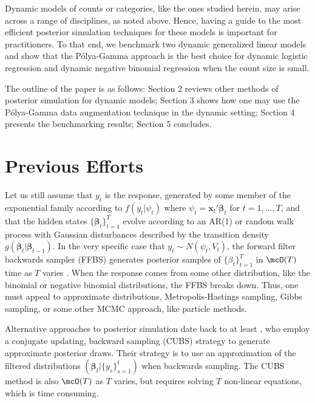 \documentclass[12pt]{article}
\newcommand{\Polya}{P\'{o}lya}
\newcommand{\bbeta}{\boldsymbol{\beta}}
\newcommand{\vx}{\boldsymbol{x}}
\newcounter{parnum}
\newcommand{\npoint}{%
  \noindent\refstepcounter{parnum}%
  \makebox[0.5in][c]{\textbf{\arabic{parnum}.}} %
  \marginnote{\small\ttfamily\the\inputlineno}}
\renewcommand{\npoint}{}
\begin{document}
\npoint Dynamic models of counts or categories, like the ones studied herein,
may arise across a range of disciplines, as noted above.  Hence, having a guide
to the most efficient posterior simulation techniques for these models is
important for practitioners.  To that end, we benchmark two dynamic generalized
linear models and show that the \Polya-Gamma approach is the best choice for
dynamic logistic regression and dynamic negative binomial regression when the
count size is small.

\npoint The outline of the paper is as follows: Section 2 reviews other methods
of posterior simulation for dynamic models; Section 3 shows how one may use the
\Polya-Gamma data augmentation technique in the dynamic setting; Section 4
presents the benchmarking results; Section 5 concludes.

\section{Previous Efforts}
\label{sec:previous-efforts}

\npoint Let us still assume that $y_t$ is the response, generated by some member
of the exponential family according to $f(y_t | \psi_t)$ where $\psi_t = \vx_t'
\bbeta_t$ for $t=1, \ldots, T$, and that the hidden states
$\{\bbeta_t\}_{t=1}^T$ evolve according to an AR(1) or random walk process with
Gaussian disturbances described by the transition density $g(\bbeta_t |
\bbeta_{t-1})$.
\npoint In the very specific case that $y_t \sim N(\psi_t, V_t)$, the forward
filter backwards sampler (FFBS) generates posterior samples of
$\{\beta_{t}\}_{t=1}^T$ in $\mcO(T)$ time as $T$ varies \citep{carter-kohn-1994,
  fruhwirth-schnatter-1994}.  When the response comes from some other
distribution, like the binomial or negative binomial distributions, the FFBS
breaks down.
\npoint Thus, one must appeal to approximate distributions, Metropolis-Hastings
sampling, Gibbs sampling, or some other MCMC approach, like particle methods.

\npoint Alternative approaches to posterior simulation date back to at least
\cite{west-etal-1985}, who employ a conjugate updating, backward sampling (CUBS)
strategy to generate approximate posterior draws.  Their strategy is to use an
approximation of the filtered distributions $(\bbeta_t | \{y_s\}_{s=1}^t)$ when
backwards sampling.  The CUBS method is also $\mcO(T)$ as $T$ varies, but
requires solving $T$ non-linear equations, which is time consuming.
\end{document}
